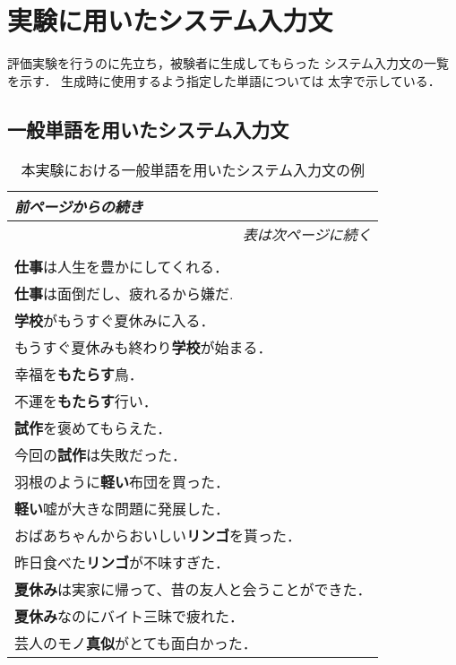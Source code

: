 \chapter{実験に用いたシステム入力文}

評価実験を行うのに先立ち，被験者に生成してもらった
システム入力文の一覧を示す．
生成時に使用するよう指定した単語については
太字で示している．

\section{一般単語を用いたシステム入力文}

\begin{longtable}[C]{|l|}
	\caption{本実験における一般単語を用いたシステム入力文の例}
	\label{table:normal_input_list}
	\\
	\endfirsthead
	\multicolumn{1}{l}{\small\it 前ページからの続き}\\
 	\endhead
	\multicolumn{1}{r}{\small\it 表は次ページに続く}\\
	\endfoot
	\multicolumn{1}{r}{\small\it これで終わり}\\
 	\endlastfoot
		\hline
		\textbf{仕事}は人生を豊かにしてくれる． \\
		\hline
		\textbf{仕事}は面倒だし、疲れるから嫌だ. \\
		\hline
		\textbf{学校}がもうすぐ夏休みに入る． \\
		\hline
		もうすぐ夏休みも終わり\textbf{学校}が始まる．	\\
		\hline
		幸福を\textbf{もたらす}鳥．	\\
		\hline
		不運を\textbf{もたらす}行い．	\\
		\hline
		\textbf{試作}を褒めてもらえた． \\
		\hline
		今回の\textbf{試作}は失敗だった．	\\
		\hline
		羽根のように\textbf{軽い}布団を買った．	\\
		\hline
		\textbf{軽い}嘘が大きな問題に発展した．	\\
		\hline
		おばあちゃんからおいしい\textbf{リンゴ}を貰った．	\\
		\hline
		昨日食べた\textbf{リンゴ}が不味すぎた．	\\
		\hline
		\textbf{夏休み}は実家に帰って、昔の友人と会うことができた．	\\
		\hline
		\textbf{夏休み}なのにバイト三昧で疲れた．	\\
		\hline
		芸人のモノ\textbf{真似}がとても面白かった．	\\

\end{longtable}
